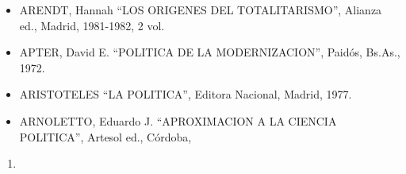 \documentclass[
]{book}
\providecommand{\tightlist}{%
  \setlength{\itemsep}{0pt}\setlength{\parskip}{0pt}}
\begin{document}
\begin{itemize}
\tightlist
\item
  ARENDT, Hannah ``LOS ORIGENES DEL TOTALITARISMO'', Alianza ed., Madrid, 1981-1982,
  2 vol.
\item
  APTER, David E. ``POLITICA DE LA MODERNIZACION'', Paidós, Bs.As., 1972.
\item
  ARISTOTELES ``LA POLITICA'', Editora Nacional, Madrid, 1977.
\item
  ARNOLETTO, Eduardo J. ``APROXIMACION A LA CIENCIA POLITICA'', Artesol ed., Córdoba,
\end{itemize}

\begin{enumerate}
\def\labelenumi{\arabic{enumi}.}
\setcounter{enumi}{1988}
\tightlist
\item
\end{enumerate}
\end{document}
